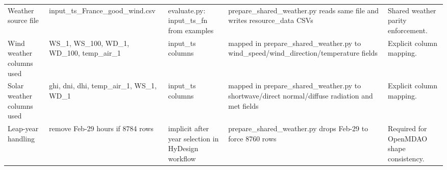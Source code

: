 \begin{center}
\begin{longtable}{p{} p{} p{} p{} p{}}
Weather source file & input\_ts\_France\_good\_wind.csv & evaluate.py: input\_ts\_fn from examples & prepare\_shared\_weather.py reads same file and writes resource\_data CSVs & Shared weather parity enforcement. \\
Wind weather columns used & WS\_1, WS\_100, WD\_1, WD\_100, temp\_air\_1 & input\_ts columns & mapped in prepare\_shared\_weather.py to wind\_speed/wind\_direction/temperature fields & Explicit column mapping. \\
Solar weather columns used & ghi, dni, dhi, temp\_air\_1, WS\_1, WD\_1 & input\_ts columns & mapped in prepare\_shared\_weather.py to shortwave/direct normal/diffuse radiation and met fields & Explicit column mapping. \\
Leap-year handling & remove Feb-29 hours if 8784 rows & implicit after year selection in HyDesign workflow & prepare\_shared\_weather.py drops Feb-29 to force 8760 rows & Required for OpenMDAO shape consistency. \\


\end{longtable}
\end{center}
